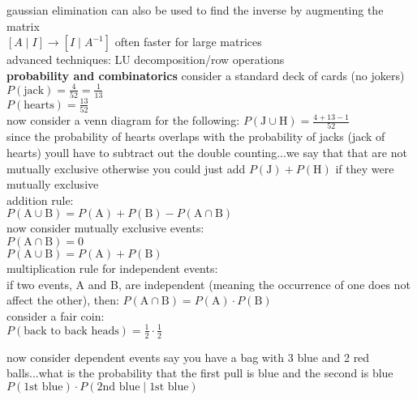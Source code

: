 \documentclass{article}
\begin{document}
gaussian elimination can also be used to find the inverse by augmenting the matrix\\

$[A \mid I] \to [I \mid A^{-1}]$ often faster for large matrices\\

advanced techniques: LU decomposition/row operations\\

\textbf{probability and combinatorics}
consider a standard deck of cards (no jokers)\\
$P(\text{jack}) = \frac{4}{52} = \frac{1}{13}$\\
$P(\text{hearts}) = \frac{13}{52}$\\

now consider a venn diagram for the following:
$P(\text{J} \cup \text{H}) = \frac{4 + 13 - 1}{52}$\\
since the probability of hearts overlaps with the probability of jacks (jack of hearts) youll have to subtract out the double counting...we say that that are not mutually exclusive otherwise you could just add $P(\text{J}) + P(\text{H})$ if they were mutually exclusive\\

addition rule:\\
$P(\text{A} \cup \text{B}) = P(\text{A}) + P(\text{B}) - P(\text{A} \cap \text{B})$\\

now consider mutually exclusive events:\\
$P(\text{A} \cap \text{B}) = 0$\\
$P(\text{A} \cup \text{B}) = P(\text{A}) + P(\text{B})$\\

multiplication rule for independent events:\\
if two events, A and B, are independent (meaning the occurrence of one does not affect the other), then: $P(\text{A} \cap \text{B}) = P(\text{A}) \cdot P(\text{B})$\\

consider a fair coin:\\
$P(\text{back to back heads}) = \frac{1}{2} \cdot \frac{1}{2}$

now consider dependent events say you have a bag with 3 blue and 2 red balls...what is the probability that the first pull is blue and the second is blue\\
$P(\text{1st blue}) \cdot P(\text{2nd blue} \mid \text{1st blue})$\\
\end{document}
